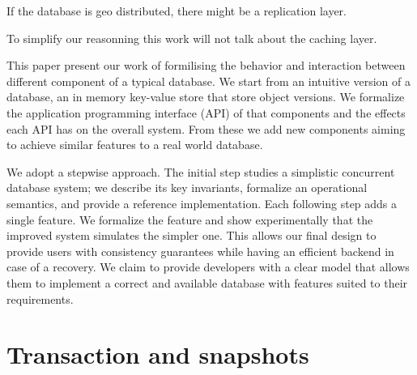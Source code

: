\documentclass[parallelisme]{compas2022}
\begin{document}
If the database is geo distributed, there might be a replication layer.

To simplify our reasonning this work will not talk about the caching layer.

This paper present our work of formilising the behavior and  interaction between different component of a typical database.
We start from an intuitive version of a database, an in memory key-value store that store object versions.
We formalize the application programming interface (API) of that components and the effects each API has on the overall system.
From these we add new components aiming to achieve similar features to a real world database.

We adopt a stepwise approach.
The initial step studies a simplistic concurrent database system; we describe its key invariants, formalize an operational semantics, and provide a reference implementation.
Each following step adds a single feature.
We formalize the feature and show experimentally that the improved system simulates the simpler one.
This allows our final design to provide users with consistency guarantees while having an efficient backend in case of a recovery.
We claim to provide developers with a clear model that allows them to implement a correct and available database with features suited to their requirements.





\section{Transaction and snapshots}
\end{document}
